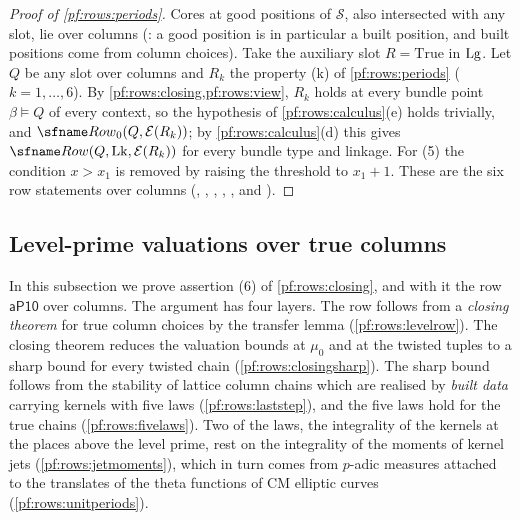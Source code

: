 \begin{proof}[Proof of \cref{pf:rows:periods}]
Cores at good positions of $\mathcal S$, also intersected with any slot, lie over columns
(: a good position is in particular a built position, and built
positions come from column choices). Take the auxiliary slot $R=\mathrm{True}$ in $\mathrm{Lg}$. Let $Q$ be any slot over columns
and $R_k$ the property (k) of \cref{pf:rows:periods} ($k=1,\dots,6$). By \cref{pf:rows:closing,pf:rows:view}, $R_k$ holds at
every bundle point $\beta\models Q$ of every context, so the hypothesis of \cref{pf:rows:calculus}(e) holds trivially, and
$\rowsRowZ(Q,\rowsEvC(R_k))$; by \cref{pf:rows:calculus}(d) this gives $\rowsRow(Q,\rowsLk,\rowsEvC(R_k))$ for every bundle type
and linkage. For (5) the condition $x>x_1$ is removed by raising the threshold to $x_1+1$. These are the six row
statements over columns
(, , , , , and ).
\end{proof}

\subsection{Level-prime valuations over true columns}\label{sec:pf:rows:level}

In this subsection we prove assertion (6) of \cref{pf:rows:closing}, and with it the row $\mathsf{aP10}$ over columns. The
argument has four layers. The row follows from a \emph{closing theorem} for true column choices by the transfer lemma
(\cref{pf:rows:levelrow}). The closing theorem reduces the valuation bounds at $\mu_0$ and at the twisted tuples to a sharp
bound for every twisted chain (\cref{pf:rows:closingsharp}). The sharp bound follows from the stability of lattice column
chains which are realised by \emph{built data} carrying kernels with five laws (\cref{pf:rows:laststep}), and the five laws
hold for the true chains (\cref{pf:rows:fivelaws}). Two of the laws, the integrality of the kernels at the places above the
level prime, rest on the integrality of the moments of kernel jets (\cref{pf:rows:jetmoments}), which in turn comes from
$p$-adic measures attached to the translates of the theta functions of CM elliptic curves (\cref{pf:rows:unitperiods}).


